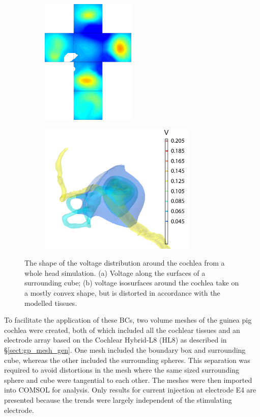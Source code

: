 \begin{figure}
    \centering
    
    \begin{subfigure}[t]{0.4\textwidth}
        \centering
        \includegraphics[height=6cm]{Simulations/BCs/head_prelim_volt_net}
        \caption{}
        \label{fig:bc_head_net}
    \end{subfigure}%
    \begin{subfigure}[t]{0.55\textwidth}
        \centering
        \includegraphics[height=6.2cm]{Simulations/BCs/head_prelim_volt_iso}
        \caption{}
        \label{fig:bc_head_iso}
    \end{subfigure}%
    
	\caption[The shape of the voltage distribution around the cochlea]{The shape of
	the voltage distribution around the cochlea from a whole head simulation. (a)
	Voltage along the surfaces of a surrounding cube; (b) voltage isosurfaces
	around the cochlea take on a mostly convex shape, but is distorted in
	accordance with the modelled tissues.}
	\label{fig:voltage_dist_shape}
\end{figure}

To facilitate the application of these BCs, two volume meshes of the guinea pig
cochlea were created, both of which included all the cochlear tissues and an
electrode array based on the Cochlear Hybrid-L8 (HL8) as described in
\S\ref{sect:gp_mesh_gen}. One mesh included the boundary box and surrounding
cube, whereas the other included the surrounding spheres. This separation was
required to avoid distortions in the mesh where the same sized surrounding
sphere and cube were tangential to each other. The meshes were then imported
into COMSOL for analysis. Only results for current injection at electrode E4 are
presented because the trends were largely independent of the stimulating
electrode.

